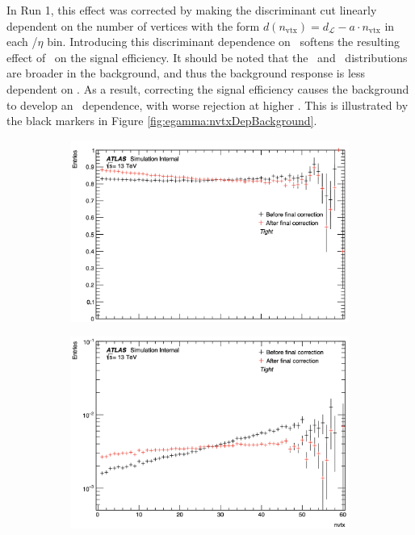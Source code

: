 In Run 1, this effect was corrected by making the discriminant cut linearly dependent on the number of vertices with the form $d(n_{\mathrm{vtx}}) = d_{\mathcal{L}} - a\cdot n_{\mathrm{vtx}}$ in each \et/$\eta$ bin.
Introducing this discriminant dependence on \nvtx\ softens the resulting effect of \nvtx ~on the signal efficiency.
It should be noted that the \rhad\ and \reta\ distributions are broader in the background, and thus the background response is less dependent on \nvtx.
As a result, correcting the signal efficiency causes the background to develop an \nvtx\ dependence, with worse rejection at higher \nvtx.
This is illustrated by the black markers in Figure \ref{fig:egamma:nvtxDepBackground}.
\begin{figure}[h]
\centering
    \begin{subfigure}[b]{0.49\textwidth}
      \centering
      \includegraphics[width=1.0\textwidth]{figs/egamma/nvtxdepSignal.png}
      \caption{}
      \label{fig:egamma:nvtxDepSignal}
    \end{subfigure}
    \hfill
    \begin{subfigure}[b]{0.49\textwidth}
      \centering
      \includegraphics[width=1.0\textwidth]{figs/egamma/nvtxdepBackground.png}

\end{subfigure}
\end{figure}
